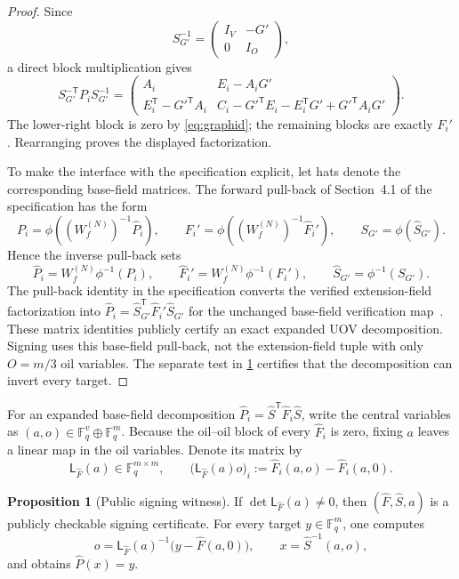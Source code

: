 \documentclass[11pt,a4paper]{article}
\theoremstyle{definition}
\newtheorem{proposition}[theorem]{Proposition}
\theoremstyle{remark}
\newcommand{\F}{\mathbb F}
\newcommand{\trans}{\mathsf T}
\begin{document}
\begin{proof}
Since
\[
S_{G'}^{-1}=\begin{pmatrix}I_V&-G'\\0&I_O\end{pmatrix},
\]
a direct block multiplication gives
\[
S_{G'}^{-\trans}P_iS_{G'}^{-1}
=
\begin{pmatrix}
A_i&E_i-A_iG'\\
E_i^{\trans}-{G'}^{\trans}A_i&
C_i-{G'}^{\trans}E_i-E_i^{\trans}G'+{G'}^{\trans}A_iG'
\end{pmatrix}.
\]
The lower-right block is zero by \eqref{eq:graphid}; the remaining blocks are exactly $F_i'$.  Rearranging proves the displayed factorization.

To make the interface with the specification explicit, let hats denote the corresponding base-field matrices.  The forward pull-back of Section~4.1 of the specification has the form
\[
P_i=\phi\!\left((W_f^{(N)})^{-1}\widehat P_i\right),\qquad
F_i'=\phi\!\left((W_f^{(N)})^{-1}\widehat F_i'\right),\qquad
S_{G'}=\phi(\widehat S_{G'}).
\]
Hence the inverse pull-back sets
\[
\widehat P_i=W_f^{(N)}\phi^{-1}(P_i),\qquad
\widehat F_i'=W_f^{(N)}\phi^{-1}(F_i'),\qquad
\widehat S_{G'}=\phi^{-1}(S_{G'}).
\]
The pull-back identity in the specification converts the verified extension-field factorization into
$\widehat P_i=\widehat S_{G'}^{\trans}\widehat F_i'\widehat S_{G'}$ for the unchanged base-field verification map~\cite[Sec.~4.1]{QRUOVSpec}.  These matrix identities publicly certify an exact expanded UOV decomposition.  Signing uses this base-field pull-back, not the extension-field tuple with only $O=m/3$ oil variables.  The separate test in \cref{prop:signing-witness} certifies that the decomposition can invert every target.
\end{proof}

For an expanded base-field decomposition $\widehat P_i=\widehat S^{\mathsf T}\widehat F_i\widehat S$, write the central variables as $(a,o)\in\F_q^v\oplus\F_q^m$.  Because the oil--oil block of every $\widehat F_i$ is zero, fixing $a$ leaves a linear map in the oil variables.  Denote its matrix by
\begin{equation}\label{eq:signing-matrix}
\mathsf L_{\widehat F}(a)\in\F_q^{m\times m},
\qquad
\bigl(\mathsf L_{\widehat F}(a)o\bigr)_i
:=\widehat F_i(a,o)-\widehat F_i(a,0).
\end{equation}

\begin{proposition}[Public signing witness]\label{prop:signing-witness}
If $\det\mathsf L_{\widehat F}(a)\ne0$, then $(\widehat F,\widehat S,a)$ is a publicly checkable signing certificate.  For every target $y\in\F_q^m$, one computes
\[
o=\mathsf L_{\widehat F}(a)^{-1}\bigl(y-\widehat F(a,0)\bigr),
\qquad
x=\widehat S^{-1}(a,o),
\]
and obtains $\widehat P(x)=y$.
\end{proposition}
\end{document}

